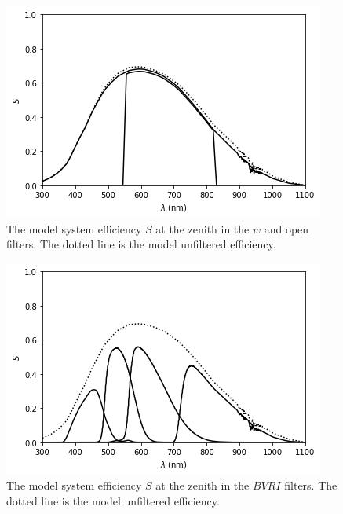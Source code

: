 \begin{figure}
\begin{center}
\includegraphics[width=0.7\linewidth]{figures/huitzi-f20-S-w-open.png}
\medskip
\caption{The model system efficiency $S$ at the zenith in the $w$ and open filters. The dotted line is the model unfiltered efficiency.}
\end{center}
\end{figure}

\begin{figure}
\begin{center}
\includegraphics[width=0.7\linewidth]{figures/huitzi-f20-S-JC-BVRI.png}
\medskip
\caption{The model system efficiency $S$ at the zenith in the $BVRI$ filters. The dotted line is the model unfiltered efficiency.}
\end{center}
\end{figure}

